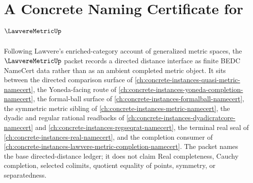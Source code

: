 \chapter{A Concrete Naming Certificate for $\LawvereMetricUp$}
\label{ch:concrete-instances-lawvere-metric-namecert}

Following Lawvere's enriched-category account of generalized metric spaces, the $\LawvereMetricUp$ packet records a directed distance interface as finite BEDC NameCert data rather than as an ambient completed metric object. It sits between the directed comparison surface of \autoref{ch:concrete-instances-quasi-metric-namecert}, the Yoneda-facing route of \autoref{ch:concrete-instances-yoneda-completion-namecert}, the formal-ball surface of \autoref{ch:concrete-instances-formalball-namecert}, the symmetric metric sibling of \autoref{ch:concrete-instances-metric-namecert}, the dyadic and regular rational readbacks of \autoref{ch:concrete-instances-dyadicratcore-namecert} and \autoref{ch:concrete-instances-regseqrat-namecert}, the terminal real seal of \autoref{ch:concrete-instances-real-namecert}, and the completion consumer of \autoref{ch:concrete-instances-lawvere-metric-completion-namecert}. The packet names the base directed-distance ledger; it does not claim Real completeness, Cauchy completion, selected colimits, quotient equality of points, symmetry, or separatedness.

